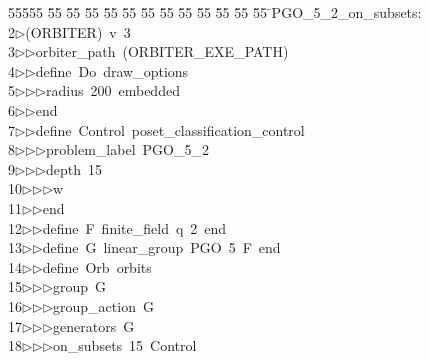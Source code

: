 %
%
\begin{tabbing}
55555 \= 55 \= 55 \= 55 \= 55 \= 55 \= 55 \= 55 \= 55 \= 55 \= 55 \= 55 \= 55 \= \>PGO\_5\_2\_on\_subsets:\\[0pt]
2\>$\triangleright$\>(ORBITER)\ v\ 3\ \\[0pt]
3\>$\triangleright$\>$\triangleright$\>orbiter\_path\ (ORBITER\_EXE\_PATH)\ \\[0pt]
4\>$\triangleright$\>$\triangleright$\>define\ Do\ draw\_options\ \\[0pt]
5\>$\triangleright$\>$\triangleright$\>$\triangleright$\>radius\ 200\ embedded\ \\[0pt]
6\>$\triangleright$\>$\triangleright$\>end\ \\[0pt]
7\>$\triangleright$\>$\triangleright$\>define\ Control\ poset\_classification\_control\ \\[0pt]
8\>$\triangleright$\>$\triangleright$\>$\triangleright$\>problem\_label\ PGO\_5\_2\ \\[0pt]
9\>$\triangleright$\>$\triangleright$\>$\triangleright$\>depth\ 15\ \\[0pt]
10\>$\triangleright$\>$\triangleright$\>$\triangleright$\>w\ \\[0pt]
11\>$\triangleright$\>$\triangleright$\>end\ \\[0pt]
12\>$\triangleright$\>$\triangleright$\>define\ F\ finite\_field\ q\ 2\ end\ \\[0pt]
13\>$\triangleright$\>$\triangleright$\>define\ G\ linear\_group\ PGO\ 5\ F\ end\ \\[0pt]
14\>$\triangleright$\>$\triangleright$\>define\ Orb\ orbits\ \\[0pt]
15\>$\triangleright$\>$\triangleright$\>$\triangleright$\>group\ G\ \\[0pt]
16\>$\triangleright$\>$\triangleright$\>$\triangleright$\>group\_action\ G\ \\[0pt]
17\>$\triangleright$\>$\triangleright$\>$\triangleright$\>generators\ G\ \\[0pt]
18\>$\triangleright$\>$\triangleright$\>$\triangleright$\>on\_subsets\ 15\ Control\ \\[0pt]

\end{tabbing}
